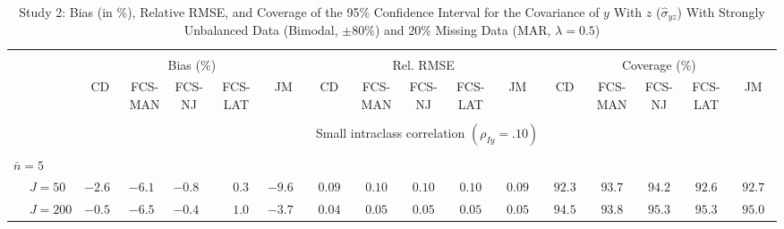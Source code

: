 \begin{sidewaystable}
\begin{threeparttable}
\setlength{\tabcolsep}{1.0pt}
\renewcommand{\arraystretch}{0.95}
\footnotesize
\caption{\small Study 2: Bias (in \%), Relative RMSE, and Coverage of the 95\% Confidence Interval for the Covariance of $y$ With $z$ ($\hat\sigma_{yz}$) With Strongly Unbalanced Data (Bimodal, $\pm 80\%$) and 20\% Missing Data (MAR, $\lambda=0.5$)}
\begin{tabular}{llccccccccccccccc}
\hline\\[-1.8ex]
& & \multicolumn{5}{c}{Bias (\%)} & \multicolumn{5}{c}{Rel. RMSE} & \multicolumn{5}{c}{Coverage (\%)} \\ \cmidrule(r){3-7}\cmidrule(r){8-12}\cmidrule(r){13-17}
 &  & CD & \makecell{FCS-\\MAN} & \makecell{FCS-\\NJ} & \makecell{FCS-\\LAT} & JM & CD & \makecell{FCS-\\MAN} & \makecell{FCS-\\NJ} & \makecell{FCS-\\LAT} & JM & CD & \makecell{FCS-\\MAN} & \makecell{FCS-\\NJ} & \makecell{FCS-\\LAT} & \multicolumn{1}{c}{JM} \\ 
[0.4ex]\hline\\[-1.8ex]
& & \multicolumn{15}{c}{Small intraclass correlation $(\rho_{Iy}=.10)$} \\[0.6ex]\hline\\[-1.8ex]
\multicolumn{4}{l}{$\bar{n}=5$} \\  & \nopagebreak $\;J=50$  & ${-}2.6\phantom{0}$ & ${-}6.1\phantom{0}$ & ${-}0.8\phantom{0}$ & $\phantom{-}0.3\phantom{0}$ & ${-}9.6\phantom{0}$ & $\phantom{0}0.09\phantom{0}$ & $\phantom{0}0.10\phantom{0}$ & $\phantom{0}0.10\phantom{0}$ & $\phantom{0}0.10\phantom{0}$ & $\phantom{0}0.09\phantom{0}$ & $\phantom{0}92.3\phantom{0}$ & $\phantom{0}93.7\phantom{0}$ & $\phantom{0}94.2\phantom{0}$ & $\phantom{0}92.6\phantom{0}$ & $\phantom{0}92.7\phantom{0}$ \\
 & \nopagebreak $\;J=200$  & ${-}0.5\phantom{0}$ & ${-}6.5\phantom{0}$ & ${-}0.4\phantom{0}$ & $\phantom{-}1.0\phantom{0}$ & ${-}3.7\phantom{0}$ & $\phantom{0}0.04\phantom{0}$ & $\phantom{0}0.05\phantom{0}$ & $\phantom{0}0.05\phantom{0}$ & $\phantom{0}0.05\phantom{0}$ & $\phantom{0}0.05\phantom{0}$ & $\phantom{0}94.5\phantom{0}$ & $\phantom{0}93.8\phantom{0}$ & $\phantom{0}95.3\phantom{0}$ & $\phantom{0}95.3\phantom{0}$ & $\phantom{0}95.0\phantom{0}$ \\

\end{tabular}
\end{threeparttable}
\end{sidewaystable}
